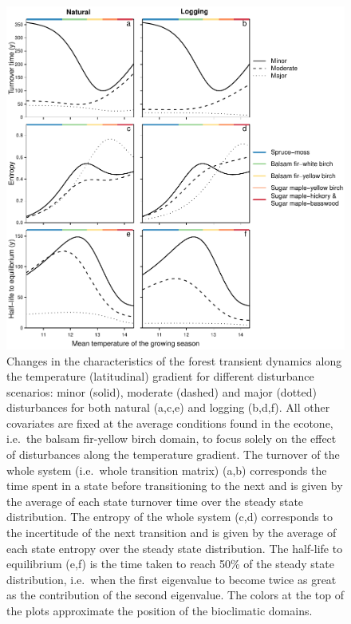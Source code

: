 \documentclass[a4paperpaper,]{article}
\begin{document}
\begin{figure}
\centering
\includegraphics{res/fig7_index_gradient.pdf}
\caption{Changes in the characteristics of the forest transient dynamics
along the temperature (latitudinal) gradient for different disturbance
scenarios: minor (solid), moderate (dashed) and major (dotted)
disturbances for both natural (a,c,e) and logging (b,d,f). All other
covariates are fixed at the average conditions found in the ecotone,
i.e.~the balsam fir-yellow birch domain, to focus solely on the effect
of disturbances along the temperature gradient. The turnover of the
whole system (i.e.~whole transition matrix) (a,b) corresponds the time
spent in a state before transitioning to the next and is given by the
average of each state turnover time over the steady state distribution.
The entropy of the whole system (c,d) corresponds to the incertitude of
the next transition and is given by the average of each state entropy
over the steady state distribution. The half-life to equilibrium (e,f)
is the time taken to reach 50\% of the steady state distribution,
i.e.~when the first eigenvalue to become twice as great as the
contribution of the second eigenvalue. The colors at the top of the
plots approximate the position of the bioclimatic domains.}
\end{figure}
\end{document}
